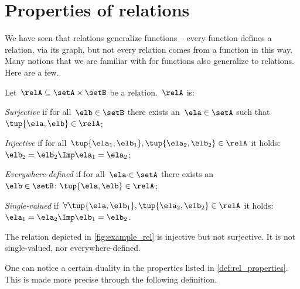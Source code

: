 

\section{Properties of relations}

We have seen that relations generalize functions -- every function defines a relation, via its graph, but not every relation comes from a function in this way. Many notions that we are familiar with for functions also generalize to relations. Here are a few. 

\begin{definition}
  \label{def:rel_properties}
  Let~$\relA\subseteq \setA \times \setB$ be a relation.~$\relA$ is:
  \begin{compactenum}
    \item \emph{Surjective} if for all~$\elb\in \setB$ there exists an~$\ela\in \setA$ such that~$\tup{\ela,\elb}\in \relA$;
    \item \emph{Injective} if for all~$ \tup{\ela_1,\elb_1},\tup{\ela_2,\elb_2}\in \relA$ it holds:~$\elb_2=\elb_2 \Imp \ela_1=\ela_2$;
    \item \emph{Everywhere-defined} if for all~$\ela\in \setA$ there exists an ~$\elb \in \setB\colon \tup{\ela,\elb}\in \relA$;
    \item \emph{Single-valued} if~$\forall \tup{\ela,\elb_1},\tup{\ela_2,\elb_2}\in \relA$ it holds:~$\ela_1=\ela_2\Imp \elb_1=\elb_2$.
  \end{compactenum}
\end{definition}

\begin{example}
  The relation depicted in \cref{fig:example_rel} is injective but not surjective. It is not single-valued, nor everywhere-defined. \end{example}

One can notice a certain duality in the properties listed in \cref{def:rel_properties}. This is made more precise through the following definition.

